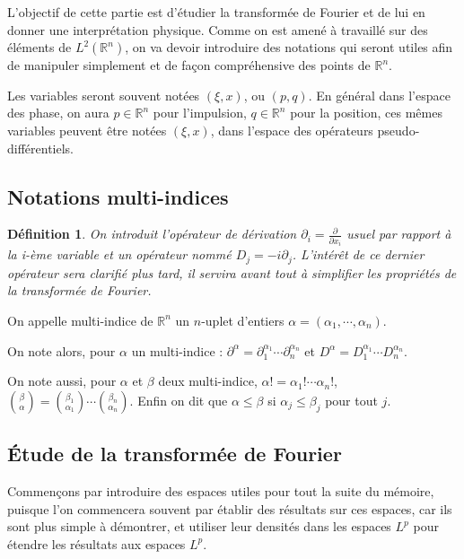 \documentclass[a4paper, 12pt]{report}
\newcommand{\R}{\mathbb{R}} %
\renewcommand{\.}{\cdot} %
\theoremstyle{break}
\newtheorem{definition}{Définition}
\theoremstyle{remark}
\theoremstyle{proofstyle}
\begin{document}
L'objectif de cette partie est d'étudier la transformée de Fourier et de lui en donner une interprétation physique.
Comme on est amené à travaillé sur des éléments de $L^2(\R^n)$, on va devoir introduire des notations qui seront utiles afin de manipuler simplement et de façon compréhensive des points de $\R^n$.\vspace{10pt}

Les variables seront souvent notées $(\xi, x)$, ou $(p,q)$. En général dans l'espace des phase, on aura $p \in \mathbb{R}^n$ pour l'impulsion, $q \in \mathbb{R}^n$ pour la position, ces mêmes variables peuvent être notées $(\xi, x)$, dans l'espace des opérateurs pseudo-différentiels.

\subsection{Notations multi-indices}

\begin{definition}
    On introduit l'opérateur de dérivation $\partial_i = \frac{\partial}{\partial x_i}$ usuel par rapport à la i-ème variable et un opérateur nommé $D_j = -i \partial_j$. L'intérêt de ce dernier opérateur sera clarifié plus tard, il servira avant tout à simplifier les propriétés de la transformée de Fourier.
\end{definition}

On appelle multi-indice de $\mathbb{R}^n$ un $n$-uplet d'entiers $\alpha = (\alpha_1, \cdots, \alpha_n)$.\vspace{2pt}

On note alors, pour $\alpha$ un multi-indice : $\partial^\alpha = \partial_1^{\alpha_1} \cdots \partial_n^{\alpha_n}$ et $D^\alpha = D_1^{\alpha_1} \cdots D_n^{\alpha_n}$. \vspace{2pt}

On note aussi, pour $\alpha$ et  $\beta$ deux multi-indice, $\alpha! = \alpha_1! \cdots \alpha_n!$, $\binom{\beta}{\alpha} = \binom{\beta_1}{\alpha_1} \cdots \binom{\beta_n}{\alpha_n}$. Enfin on dit que $\alpha \leq \beta$ si $\alpha_j \leq \beta_j$  pour tout $j$.

\subsection{Étude de la transformée de Fourier}

Commençons par introduire des espaces utiles pour tout la suite du mémoire, puisque l'on commencera souvent par établir des résultats sur ces espaces, car ils sont plus simple à démontrer, et utiliser leur densités dans les espaces $L^p$ pour étendre les résultats aux espaces $L^p$.
\end{document}
